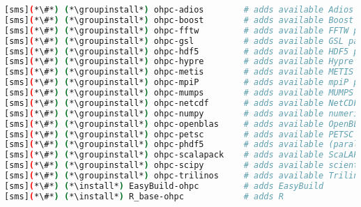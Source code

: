 \begin{lstlisting}[language=bash,keywords={},upquote=true,keepspaces]
[sms](*\#*) (*\groupinstall*) ohpc-adios        # adds available Adios packages
[sms](*\#*) (*\groupinstall*) ohpc-boost        # adds available Boost packages
[sms](*\#*) (*\groupinstall*) ohpc-fftw         # adds available FFTW packages
[sms](*\#*) (*\groupinstall*) ohpc-gsl          # adds available GSL packages
[sms](*\#*) (*\groupinstall*) ohpc-hdf5         # adds available HDF5 packages
[sms](*\#*) (*\groupinstall*) ohpc-hypre        # adds available Hypre packages
[sms](*\#*) (*\groupinstall*) ohpc-metis        # adds available METIS packages
[sms](*\#*) (*\groupinstall*) ohpc-mpiP         # adds available mpiP packages
[sms](*\#*) (*\groupinstall*) ohpc-mumps        # adds available MUMPS packages
[sms](*\#*) (*\groupinstall*) ohpc-netcdf       # adds available NetCDF packages
[sms](*\#*) (*\groupinstall*) ohpc-numpy        # adds available numerical Python packages
[sms](*\#*) (*\groupinstall*) ohpc-openblas     # adds available OpenBLAS packages
[sms](*\#*) (*\groupinstall*) ohpc-petsc        # adds available PETSC packages
[sms](*\#*) (*\groupinstall*) ohpc-phdf5        # adds available (parallel) HDF5 packages
[sms](*\#*) (*\groupinstall*) ohpc-scalapack    # adds available ScaLAPACK packages
[sms](*\#*) (*\groupinstall*) ohpc-scipy        # adds available scientific Python packages
[sms](*\#*) (*\groupinstall*) ohpc-trilinos     # adds available Trilinos packages
[sms](*\#*) (*\install*) EasyBuild-ohpc         # adds EasyBuild
[sms](*\#*) (*\install*) R_base-ohpc            # adds R
\end{lstlisting}
